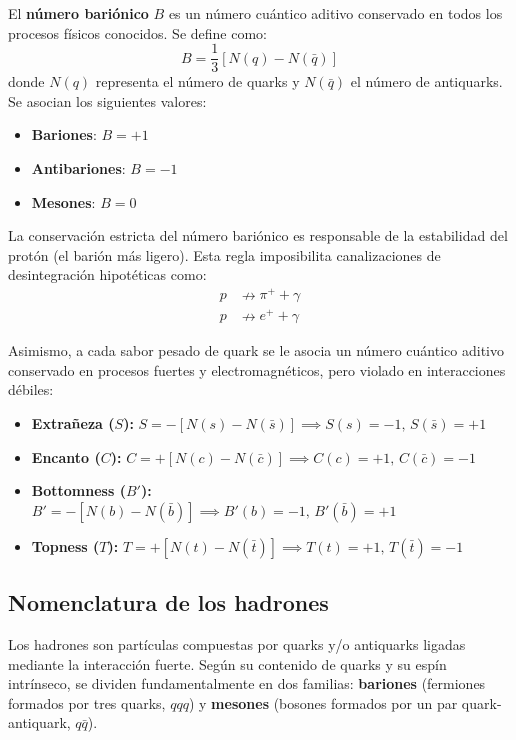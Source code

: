 El \textbf{número bariónico} $B$ es un número cuántico aditivo conservado en todos los procesos físicos conocidos. Se define como:
\begin{equation}
    B = \frac{1}{3} \left[ N(q) - N(\bar{q}) \right]
\end{equation}
donde $N(q)$ representa el número de quarks y $N(\bar{q})$ el número de antiquarks. Se asocian los siguientes valores:
\begin{itemize}
    \item \textbf{Bariones}: $B = +1$
    \item \textbf{Antibariones}: $B = -1$
    \item \textbf{Mesones}: $B = 0$
\end{itemize}

La conservación estricta del número bariónico es responsable de la estabilidad del protón (el barión más ligero). Esta regla imposibilita canalizaciones de desintegración hipotéticas como:
\begin{align}
    p &\nrightarrow \pi^+ + \gamma \\
    p &\nrightarrow e^+ + \gamma
\end{align}

Asimismo, a cada sabor pesado de quark se le asocia un número cuántico aditivo conservado en procesos fuertes y electromagnéticos, pero violado en interacciones débiles:
\begin{itemize}
    \item \textbf{Extrañeza ($S$):} $S = -[N(s) - N(\bar{s})] \implies S(s) = -1, \, S(\bar{s}) = +1$
    \item \textbf{Encanto ($C$):} $C = +[N(c) - N(\bar{c})] \implies C(c) = +1, \, C(\bar{c}) = -1$
    \item \textbf{Bottomness ($B'$):} $B' = -[N(b) - N(\bar{b})] \implies B'(b) = -1, \, B'(\bar{b}) = +1$
    \item \textbf{Topness ($T$):} $T = +[N(t) - N(\bar{t})] \implies T(t) = +1, \, T(\bar{t}) = -1$
\end{itemize}

\newpage

\subsection{Nomenclatura de los hadrones}

Los hadrones son partículas compuestas por quarks y/o antiquarks ligadas mediante la interacción fuerte. Según su contenido de quarks y su espín intrínseco, se dividen fundamentalmente en dos familias: \textbf{bariones} (fermiones formados por tres quarks, $qqq$) y \textbf{mesones} (bosones formados por un par quark-antiquark, $q\bar{q}$).

